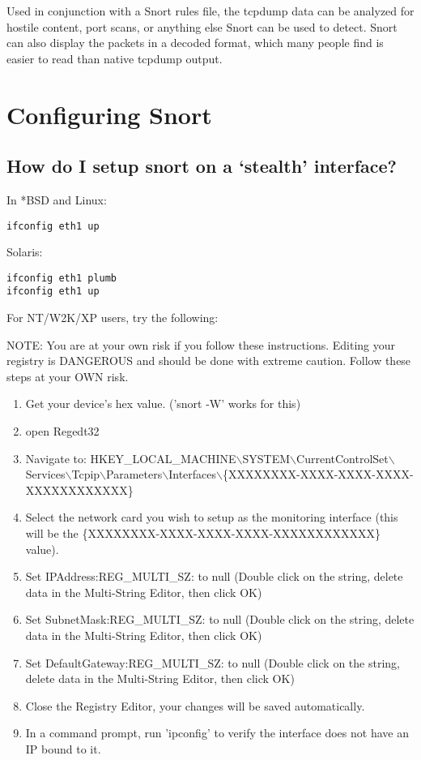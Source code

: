 \documentclass{article}
\begin{document}
Used in conjunction with a Snort rules file, the tcpdump data can be
analyzed for hostile content, port scans, or anything else Snort can be 
used to detect.  Snort can also display the packets in a decoded format, 
which many people find is easier to read than native tcpdump output. 


\section{Configuring Snort}

\subsection{How do I setup snort on a `stealth' interface? }\label{stealth}

In *BSD and Linux:
\begin{verbatim}ifconfig eth1 up\end{verbatim}

Solaris:

\begin{verbatim}ifconfig eth1 plumb
ifconfig eth1 up\end{verbatim}

For NT/W2K/XP users, try the following:

NOTE: You are at your own risk if you follow these instructions.  Editing
your registry is DANGEROUS and should be done with extreme caution.  Follow
these steps at your OWN risk.

\begin{enumerate}
\item Get your device's hex value.  ('snort -W' works for this)
\item open Regedt32
\item Navigate to: HKEY\_LOCAL\_MACHINE$\backslash$SYSTEM$\backslash$CurrentControlSet$\backslash$Services$\backslash$Tcpip$\backslash$Parameters$\backslash$\linebreak Interfaces$\backslash$\{XXXXXXXX-XXXX-XXXX-XXXX-XXXXXXXXXXXX\}
\item Select the network card you wish to setup as the monitoring interface (this will be the \{XXXXXXXX-XXXX-XXXX-XXXX-XXXXXXXXXXXX\} value).
\item Set IPAddress:REG\_MULTI\_SZ: to null (Double click on the string, delete data in the Multi-String Editor, then click OK)
\item Set SubnetMask:REG\_MULTI\_SZ: to null (Double click on the string, delete data in the Multi-String Editor, then click OK)
\item Set DefaultGateway:REG\_MULTI\_SZ: to null (Double click on the string, delete data in the Multi-String Editor, then click OK)
\item Close the Registry Editor, your changes will be saved automatically.
\item In a command prompt, run 'ipconfig' to verify the interface does not have an IP bound to it.
\end{enumerate}
\end{document}
